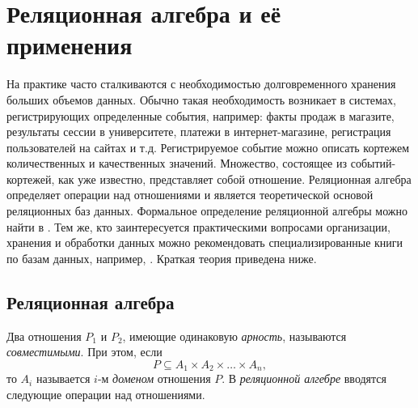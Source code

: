 \chapter{Реляционная алгебра и её применения}

На практике часто сталкиваются с необходимостью долговременного хранения больших объемов данных. Обычно такая необходимость возникает в системах, регистрирующих определенные события, например: факты продаж в магазите, результаты сессии в университете, платежи в интернет-магазине, регистрация пользователей на сайтах и т.д. Регистрируемое событие можно описать кортежем количественных и качественных значений. Множество, состоящее из событий-кортежей, как уже известно, представляет собой отношение. Реляционная алгебра определяет операции над отношениями и является теоретической основой реляционных баз данных. Формальное определение реляционной алгебры можно найти в \cite{bib:gorbatovs:discrmath,bib:haggard:discrmathprogrammer}. Тем же, кто заинтересуется практическими вопросами организации, хранения и обработки данных можно рекомендовать специализированные книги по базам данных, например, \cite{bib:krenke:db}. Краткая теория приведена ниже.


\section{Реляционная алгебра}

Два отношения $P_1$ и $P_2$, имеющие одинаковую \emph{арность}, называются \emph{совместимыми}. При этом, если 
\[P\subseteq A_1\times A_2\times\ldots\times A_n,\]
то $A_i$ называется $i$-м \emph{доменом} отношения $P$. В \emph{реляционной алгебре} вводятся следующие операции над отношениями.

